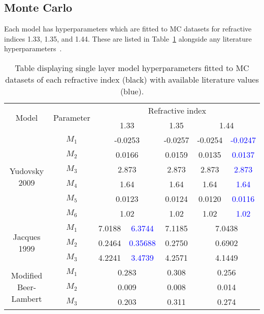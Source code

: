 \subsection{Monte Carlo}\label{sec:resultsMC}
Each model has hyperparameters which are fitted to MC datasets for refractive indices 1.33, 1.35, and 1.44. These are listed in 
Table~\ref{tb:fittedmodelparams}
alongside any literature hyperparameters~\citep{Jacques1999, Yudovsky2009}.
\begin{table}[htb!]
    \centering
    \caption{Table displaying single layer model hyperparameters fitted to MC datasets of each refractive index (black) with available literature values (blue).}
    \begin{tabular}{|cc|cc|c|cc|}
        \hline
        \multirow{2}{*}{Model} & \multirow{2}{*}{Parameter} & \multicolumn{5}{c|}{Refractive index} \\
         & & \multicolumn{2}{c|}{1.33} & 1.35 & \multicolumn{2}{c|}{1.44} \\
        \hline
        \multirow{6}{*}{Yudovsky 2009} & $M_1$ & \multicolumn{2}{c|}{-0.0253} & -0.0257 & -0.0254 & \textcolor{blue}{-0.0247} \\
        & $M_2$ & \multicolumn{2}{c|}{0.0166} & 0.0159 & 0.0135 & \textcolor{blue}{0.0137} \\
        & $M_3$ & \multicolumn{2}{c|}{2.873} & 2.873 & 2.873 & \textcolor{blue}{2.873} \\
        & $M_4$ & \multicolumn{2}{c|}{1.64} & 1.64 & 1.64 & \textcolor{blue}{1.64} \\
        & $M_5$ & \multicolumn{2}{c|}{0.0123} & 0.0124 & 0.0120 & \textcolor{blue}{0.0116} \\
        & $M_6$ & \multicolumn{2}{c|}{1.02} & 1.02 & 1.02 & \textcolor{blue}{1.02} \\
        \hline 
        \multirow{3}{*}{Jacques 1999} & $M_1$ & 7.0188 & \textcolor{blue}{6.3744} & 7.1185 & \multicolumn{2}{c|}{7.0438} \\
        & $M_2$ & 0.2464 & \textcolor{blue}{0.35688} & 0.2750 & \multicolumn{2}{c|}{0.6902} \\
        & $M_3$ & 4.2241 & \textcolor{blue}{3.4739} & 4.2571 & \multicolumn{2}{c|}{4.1449} \\
        \hline
        \multirow{3}{*}{Modified Beer-Lambert} & $M_1$ & \multicolumn{2}{c|}{0.283} & 0.308 & \multicolumn{2}{c|}{0.256} \\
        & $M_2$ & \multicolumn{2}{c|}{0.009} & 0.008 & \multicolumn{2}{c|}{0.014} \\
        & $M_3$ & \multicolumn{2}{c|}{0.203} & 0.311 & \multicolumn{2}{c|}{0.274} \\
        \hline
    \end{tabular}
    \label{tb:fittedmodelparams}%
\end{table}
